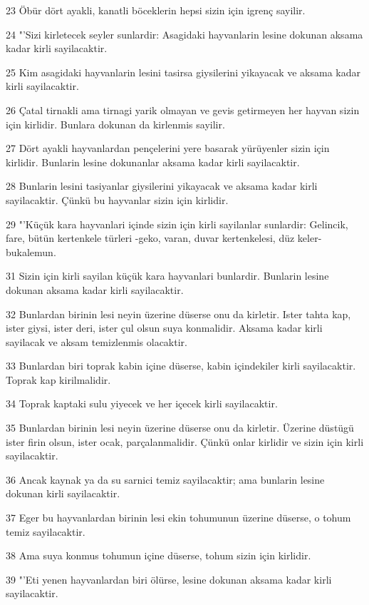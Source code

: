 \par 23 Öbür dört ayakli, kanatli böceklerin hepsi sizin için igrenç sayilir.
\par 24 "'Sizi kirletecek seyler sunlardir: Asagidaki hayvanlarin lesine dokunan aksama kadar kirli sayilacaktir.
\par 25 Kim asagidaki hayvanlarin lesini tasirsa giysilerini yikayacak ve aksama kadar kirli sayilacaktir.
\par 26 Çatal tirnakli ama tirnagi yarik olmayan ve gevis getirmeyen her hayvan sizin için kirlidir. Bunlara dokunan da kirlenmis sayilir.
\par 27 Dört ayakli hayvanlardan pençelerini yere basarak yürüyenler sizin için kirlidir. Bunlarin lesine dokunanlar aksama kadar kirli sayilacaktir.
\par 28 Bunlarin lesini tasiyanlar giysilerini yikayacak ve aksama kadar kirli sayilacaktir. Çünkü bu hayvanlar sizin için kirlidir.
\par 29 "'Küçük kara hayvanlari içinde sizin için kirli sayilanlar sunlardir: Gelincik, fare, bütün kertenkele türleri -geko, varan, duvar kertenkelesi, düz keler- bukalemun.
\par 31 Sizin için kirli sayilan küçük kara hayvanlari bunlardir. Bunlarin lesine dokunan aksama kadar kirli sayilacaktir.
\par 32 Bunlardan birinin lesi neyin üzerine düserse onu da kirletir. Ister tahta kap, ister giysi, ister deri, ister çul olsun suya konmalidir. Aksama kadar kirli sayilacak ve aksam temizlenmis olacaktir.
\par 33 Bunlardan biri toprak kabin içine düserse, kabin içindekiler kirli sayilacaktir. Toprak kap kirilmalidir.
\par 34 Toprak kaptaki sulu yiyecek ve her içecek kirli sayilacaktir.
\par 35 Bunlardan birinin lesi neyin üzerine düserse onu da kirletir. Üzerine düstügü ister firin olsun, ister ocak, parçalanmalidir. Çünkü onlar kirlidir ve sizin için kirli sayilacaktir.
\par 36 Ancak kaynak ya da su sarnici temiz sayilacaktir; ama bunlarin lesine dokunan kirli sayilacaktir.
\par 37 Eger bu hayvanlardan birinin lesi ekin tohumunun üzerine düserse, o tohum temiz sayilacaktir.
\par 38 Ama suya konmus tohumun içine düserse, tohum sizin için kirlidir.
\par 39 "'Eti yenen hayvanlardan biri ölürse, lesine dokunan aksama kadar kirli sayilacaktir.
